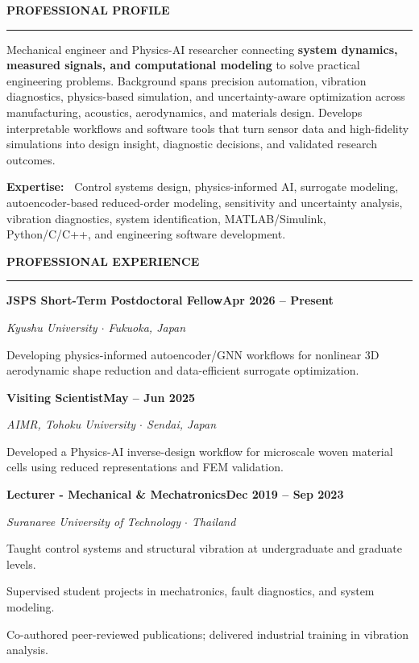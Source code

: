 \documentclass[a4paper,10pt]{article}
\newlength{\sbW}\setlength{\sbW}{63mm}
\newlength{\mnW}\setlength{\mnW}{130mm}
\newcommand{\mainsec}[1]{%
  \vspace{5pt}%
  {\color{accent}\small\bfseries\MakeUppercase{#1}}\par
  {\color{linecolor}\rule{\mnW}{0.8pt}}\par\vspace{2pt}%
}
\newcommand{\cventry}[4]{%
  \vspace{2pt}%
  \noindent\begin{minipage}[t]{\mnW}%
    {\color{darktext}\small\bfseries #1}\hfill{\color{accent}\scriptsize\bfseries #3}\par
    {\color{graytext}\footnotesize\itshape #2}\par\vspace{2pt}%
    {\footnotesize\color{bodytext}#4}%
  \end{minipage}\par%
}
\newcommand{\cvbullet}[1]{%
  {\footnotesize\color{bodytext}%
   \hspace{3pt}{\color{accent}\tiny$\blacktriangleright$}\enspace#1\par}%
}
\begin{document}
\begin{minipage}[t]{\dimexpr\textwidth-\sbW\relax}
\hspace*{7pt}\begin{minipage}[t]{\mnW}
\vspace*{8pt}

\mainsec{Professional Profile}
{\small\color{bodytext}
Mechanical engineer and Physics-AI researcher connecting \textbf{system dynamics, measured signals, and computational modeling} to solve practical engineering problems.
Background spans precision automation, vibration diagnostics, physics-based simulation, and uncertainty-aware optimization across manufacturing, acoustics, aerodynamics, and materials design.
Develops interpretable workflows and software tools that turn sensor data and high-fidelity simulations into design insight, diagnostic decisions, and validated research outcomes.\par\vspace{4pt}

{\color{darktext}\bfseries Expertise:\normalfont\color{bodytext}\ }%
Control systems design, physics-informed AI, surrogate modeling, autoencoder-based reduced-order modeling, sensitivity and uncertainty analysis, vibration diagnostics, system identification, MATLAB/Simulink, Python/C/C++, and engineering software development.%
}

\vspace*{5pt}

\mainsec{Professional Experience}

\cventry{JSPS Short-Term Postdoctoral Fellow}%
  {Kyushu University $\cdot$ Fukuoka, Japan}%
  {Apr 2026 -- Present}{%
  \cvbullet{Developing physics-informed autoencoder/GNN workflows for nonlinear 3D aerodynamic shape reduction and data-efficient surrogate optimization.}
}

\vspace{5pt}

\cventry{Visiting Scientist}%
  {AIMR, Tohoku University $\cdot$ Sendai, Japan}%
  {May -- Jun 2025}{%
  \cvbullet{Developed a Physics-AI inverse-design workflow for microscale woven material cells using reduced representations and FEM validation.}
}

\vspace{5pt}

\cventry{Lecturer - Mechanical \& Mechatronics}%
  {Suranaree University of Technology $\cdot$ Thailand}%
  {Dec 2019 -- Sep 2023}{%
  \cvbullet{Taught control systems and structural vibration at undergraduate and graduate levels.}
  \cvbullet{Supervised student projects in mechatronics, fault diagnostics, and system modeling.}
  \cvbullet{Co-authored peer-reviewed publications; delivered industrial training in vibration analysis.}%
}


\end{minipage}
\end{minipage}
\end{document}
